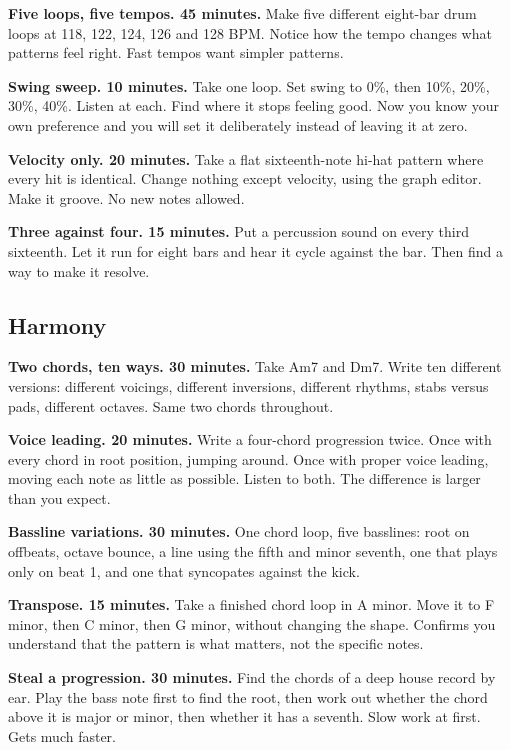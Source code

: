 \textbf{Five loops, five tempos. 45 minutes.}
Make five different eight-bar drum loops at 118, 122, 124, 126 and 128 BPM. Notice how the
tempo changes what patterns feel right. Fast tempos want simpler patterns.

\textbf{Swing sweep. 10 minutes.}
Take one loop. Set swing to 0\%, then 10\%, 20\%, 30\%, 40\%. Listen at each. Find where it stops
feeling good. Now you know your own preference and you will set it deliberately instead of
leaving it at zero.

\textbf{Velocity only. 20 minutes.}
Take a flat sixteenth-note hi-hat pattern where every hit is identical. Change nothing except
velocity, using the graph editor. Make it groove. No new notes allowed.

\textbf{Three against four. 15 minutes.}
Put a percussion sound on every third sixteenth. Let it run for eight bars and hear it cycle
against the bar. Then find a way to make it resolve.

\subsection{Harmony}\label{pr02_exercises-harmony}

\textbf{Two chords, ten ways. 30 minutes.}
Take Am7 and Dm7. Write ten different versions: different voicings, different inversions,
different rhythms, stabs versus pads, different octaves. Same two chords throughout.

\textbf{Voice leading. 20 minutes.}
Write a four-chord progression twice. Once with every chord in root position, jumping around.
Once with proper voice leading, moving each note as little as possible. Listen to both. The
difference is larger than you expect.

\textbf{Bassline variations. 30 minutes.}
One chord loop, five basslines: root on offbeats, octave bounce, a line using the fifth and
minor seventh, one that plays only on beat 1, and one that syncopates against the kick.

\textbf{Transpose. 15 minutes.}
Take a finished chord loop in A minor. Move it to F minor, then C minor, then G minor,
without changing the shape. Confirms you understand that the pattern is what matters, not
the specific notes.

\textbf{Steal a progression. 30 minutes.}
Find the chords of a deep house record by ear. Play the bass note first to find the root,
then work out whether the chord above it is major or minor, then whether it has a seventh.
Slow work at first. Gets much faster.


